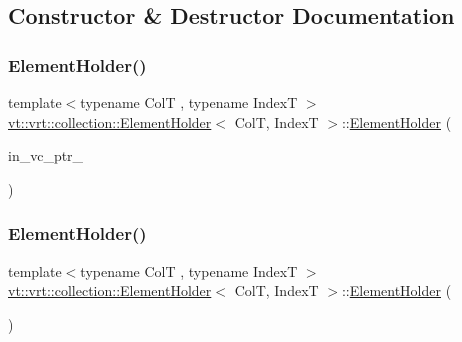\subsection{Constructor \& Destructor Documentation}
\mbox{\label{structvt_1_1vrt_1_1collection_1_1_element_holder_ad8d672e74c498a661fa251bcad5cf148}} 
\subsubsection{\texorpdfstring{Element\+Holder()}{ElementHolder()}\hspace{0.1cm}{\footnotesize\ttfamily [1/2]}}
{\footnotesize\ttfamily template$<$typename ColT , typename IndexT $>$ \\
\hyperlink{structvt_1_1vrt_1_1collection_1_1_element_holder}{vt\+::vrt\+::collection\+::\+Element\+Holder}$<$ ColT, IndexT $>$\+::\hyperlink{structvt_1_1vrt_1_1collection_1_1_element_holder}{Element\+Holder} (\begin{DoxyParamCaption}\item[{\hyperlink{structvt_1_1vrt_1_1collection_1_1_element_holder_afc12d1a71ec8f735f1b7fe12a067c8a6}{Virtual\+Ptr\+Type}}]{in\+\_\+vc\+\_\+ptr\+\_\+ }\end{DoxyParamCaption})\hspace{0.3cm}{\ttfamily [explicit]}}

\mbox{\label{structvt_1_1vrt_1_1collection_1_1_element_holder_acc214e54954edc0d8112c59ea7e51c02}} 
\subsubsection{\texorpdfstring{Element\+Holder()}{ElementHolder()}\hspace{0.1cm}{\footnotesize\ttfamily [2/2]}}
{\footnotesize\ttfamily template$<$typename ColT , typename IndexT $>$ \\
\hyperlink{structvt_1_1vrt_1_1collection_1_1_element_holder}{vt\+::vrt\+::collection\+::\+Element\+Holder}$<$ ColT, IndexT $>$\+::\hyperlink{structvt_1_1vrt_1_1collection_1_1_element_holder}{Element\+Holder} (\begin{DoxyParamCaption}\item[{\hyperlink{structvt_1_1vrt_1_1collection_1_1_element_holder}{Element\+Holder}$<$ ColT, IndexT $>$ \&\&}]{ }\end{DoxyParamCaption})\hspace{0.3cm}{\ttfamily [default]}}

